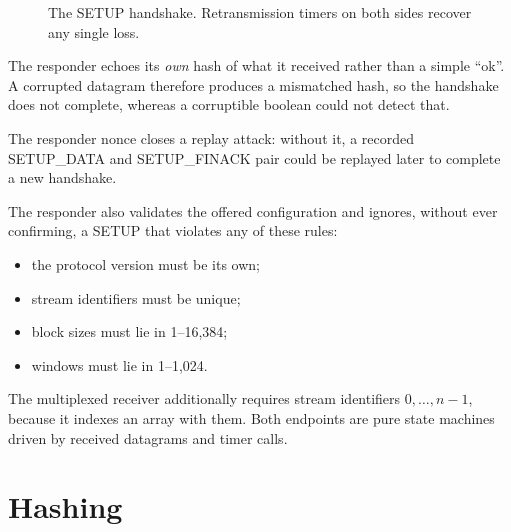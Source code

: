 \begin{figure}[H]
\centering
{}
\caption{The SETUP handshake. Retransmission timers on both sides recover any single loss.}\label{fig:setup}
\end{figure}

The responder echoes its \emph{own} hash of what it received rather than a simple ``ok''. A corrupted datagram
therefore produces a mismatched hash, so the handshake does not complete, whereas a corruptible boolean could
not detect that.

The responder nonce\vviii{} closes a replay attack: without it, a recorded SETUP\_DATA and SETUP\_FINACK pair
could be replayed later to complete a new handshake.

The responder also validates the offered configuration and ignores, without ever confirming, a SETUP that
violates any of these rules:
\begin{itemize}
  \item the protocol version must be its own;
  \item stream identifiers must be unique;
  \item block sizes must lie in 1--16,384;
  \item windows must lie in 1--1,024.
\end{itemize}
The multiplexed receiver additionally requires stream identifiers $0,\ldots,n-1$, because it indexes an array
with them. Both endpoints are pure state machines driven by received datagrams and timer calls.

\section{Hashing}

